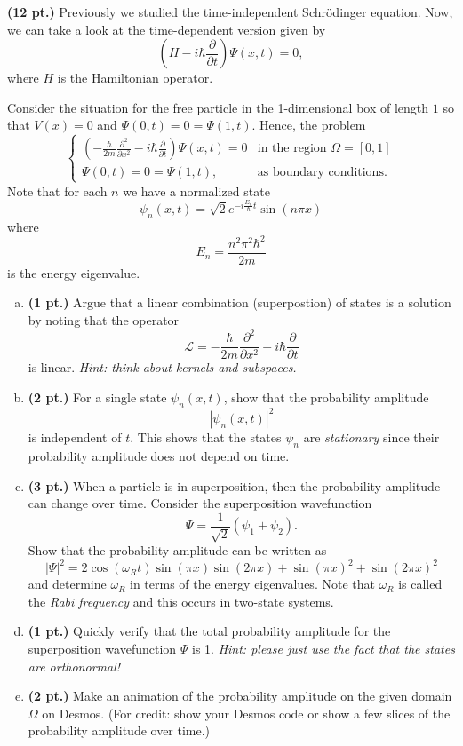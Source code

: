 \documentclass[12pt]{article} %
\begin{document}
\begin{problem}
\textbf{(12 pt.)} Previously we studied the time-independent Schr\"odinger equation. Now, we can take a look at the time-dependent version given by
\[
\left( H - i\hbar \frac{\partial}{\partial t} \right) \Psi(x,t) = 0,
\]
where $H$ is the Hamiltonian operator.  

Consider the situation for the free particle in the 1-dimensional box of length $1$ so that $V(x)=0$ and $\Psi(0,t)=0=\Psi(1,t)$. Hence, the problem
\[
\begin{cases}
\left( -\frac{\hbar}{2m} \frac{\partial ^2}{\partial x^2} - i\hbar \frac{\partial}{\partial t} \right) \Psi(x,t) = 0 & \textrm{in the region $\Omega = [0,1]$}\\
\Psi(0,t)=0=\Psi(1,t), & \textrm{as boundary conditions}.
\end{cases}
\]
Note that for each $n$ we have a normalized state
\[
\psi_n(x,t) = \sqrt{2} e^{-i \frac{E_n}{\hbar} t} \sin(n \pi x)
\]
where 
\[
E_n = \frac{n^2 \pi^2 \hbar^2}{2m}
\]
is the energy eigenvalue.
\begin{enumerate}[(a)]
    \item \textbf{(1 pt.)} Argue that a linear combination (superpostion) of states is a solution by noting that the operator
	\[
	\mathcal{L} = -\frac{\hbar}{2m} \frac{\partial ^2}{\partial x^2} - i\hbar \frac{\partial}{\partial t}
	\]
	is linear. \emph{Hint: think about kernels and subspaces.}
    \item \textbf{(2 pt.)} For a single state $\psi_n(x,t)$, show that the probability amplitude
    \[
\left|\psi_n(x,t)\right|^2
    \]
    is independent of $t$. This shows that the states $\psi_n$ are \emph{stationary} since their probability amplitude does not depend on time.
	\item \textbf{(3 pt.)} When a particle is in superposition, then the probability amplitude can change over time. Consider the superposition wavefunction
	\[
	\Psi = \frac{1}{\sqrt{2}} \left( \psi_1 + \psi_2 \right).
	\]
	Show that the probability amplitude can be written as
	\[
	|\Psi|^2 = 2 \cos(\omega_R t)\sin(\pi x)\sin(2\pi x)+ \sin(\pi x)^2 +\sin(2\pi x)^2
	\]
	and determine $\omega_R$ in terms of the energy eigenvalues. Note that $\omega_R$ is called the \emph{Rabi frequency} and this occurs in two-state systems.
	\item \textbf{(1 pt.)} Quickly verify that the total probability amplitude for the superposition wavefunction $\Psi$ is 1. \emph{Hint: please just use the fact that the states are orthonormal!}
	\item \textbf{(2 pt.)} Make an animation of the probability amplitude on the given domain $\Omega$ on Desmos. (For credit: show your Desmos code or show a few slices of the probability amplitude over time.)

\end{enumerate}
\end{problem}
\end{document}
